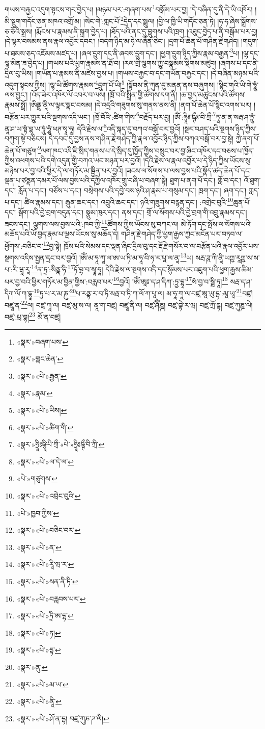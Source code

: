 གཡས་བརྐྱང་འདུག་སྟངས་གར་བྱེད་པ། །མཉམ་པར་:གཞག་པས་\footnote{«སྣར་»བཞག་པས་}བསྒོམ་པར་བྱ། །དེ་བཞིན་དུ་ནི་དེ་ཡི་འཁོར། །མི་སྡུག་གདོང་ཅན་མཁའ་འགྲོ་མ། །སེང་གེ་:གླང་པོ་\footnote{«སྣར་»གླང་ཆེན་}དྲེད་དང་སྦྲུལ། །བྱི་ལ་ཁྱི་ཡི་གདོང་ཅན་ཏེ། །ཧ་ཧ་ཞེས་སྒྲོགས་ཅ་ཅོའི་སྒྲས། །རྨོངས་པ་རྣམས་ནི་སྐྲག་བྱེད་པ། །ཐོད་པའི་ནང་དུ་བླུགས་པའི་ཁྲག །འཐུང་བྱེད་པ་ནི་བསྒོམ་པར་བྱ། །དེ་ལྟར་བསམས་ནས་རྣལ་འབྱོར་དབང་། །བདག་ཉིད་མ་ཧེ་ལ་ཞོན་ཅིང་། །དྲག་པོ་ཆེན་པོ་གཤིན་རྗེ་གཤེད། །གདུག་པ་ཐམས་ཅད་འཇོམས་མཛད་པ། །ཞལ་དྲུག་དང་ནི་ཞབས་དྲུག་དང་། །ཕྱག་དྲུག་ཉིད་ཀྱིས་རྣམ་བརྒྱན་\footnote{«སྣར་»«པེ་»རྒྱན་}པ། །ལྷ་དང་ལྷ་མིན་ཟ་བྱེད་པ། །གཡས་པའི་ཕྱག་རྣམས་ན་ཐོ་བ། །རལ་གྲི་ལྕགས་ཀྱུ་བསྣམས་སྡིགས་མཛུབ། །ཞགས་པ་དང་ནི་དྲིལ་བུ་ཡིས། །གཡོན་པ་རྣམས་ནི་མཛེས་བྱས་པ། །གཡས་བརྐྱང་བ་དང་གཡོན་བརྐྱང་དང་། །དེ་བཞིན་མཉམ་པའི་འདུག་སྟངས་ཀྱིས། །ལྷ་ཡི་ཚོགས་རྣམས་\footnote{«སྣར་»རྣམ་}དྲུག་པོ་ཡི།\footnote{«སྣར་»«པེ་»ཡིས།} །སྟོབས་ནི་ཀུན་དུ་མནན་ནས་བཞུགས། །སྙིང་གའི་ཡི་གེ་ཧཱུཾ་ལས་བྱུང་། །འོད་ཟེར་འཁོར་ལོ་འབར་བ་ལས། །ཁྲོ་བའི་སྤྲིན་གྱི་ཚོགས་དག་ནི། །ཆ་བྱད་མཚུངས་པའི་ཚོགས་རྣམས་སྤྲོ། །ཨིནྡྲ་ནཱི་ལ་ལྟར་སྣང་བསམ། །དེ་འདྲའི་གཟུགས་སུ་གནས་ནས་ནི། །ནག་པོ་ཆེན་པོ་སྙིང་འགས་པར། །བརྩོན་པར་གྱུར་པའི་སྔགས་འདི་ཡང་། །ཁྲོ་བོའི་:ཚིག་གིས་\footnote{«སྣར་»«པེ་»ཚིག་གི་}བརྗོད་པར་བྱ། །ཨོཾ་:ཧྲཱིཿ་ཥྚྀཿ་བི་ཀྲྀ་\footnote{«སྣར་»ཧྲཱིཿཥྚཱི་པི་ཀྲྀ་«པེ་»ཧྲཱིཿཥྚྀ་བི་ཀྲི་}ཏཱ་ན་ན་སརྦ་ཤ་ཏྲུཾ་ནཱ་ཤ་ཡ་སྟཾ་བྷ་ཡ་ཧཱུཾ་ཧཱུཾ་ཕཊ་སྭཱ་ཧཱ། དེའི་རྗེས་ལ་\footnote{«སྣར་»«པེ་»ལ་དེ་ལ་}འདི་སྐད་དུ་བཀའ་བསྒོ་བར་བྱའོ། །སྔར་བཤད་པའི་སྔགས་ཉིད་ཀྱིས་བཀུག་སྟེ་བཅིངས། དེ་དབང་དུ་བྱས་ནས་གཤིན་རྗེ་གཤེད་ཀྱི་རྣལ་འབྱོར་ཉིད་ཀྱིས་བཀའ་བསྒོ་བར་བྱ་སྟེ། ཀྱེ་ནག་པོ་ཆེན་པོ་གཙུག་\footnote{«པེ་»གཙུགས་}ལག་ཁང་འདི་ཇི་སྲིད་གནས་པ་དེ་སྲིད་དུ་ཁྱོད་ཀྱིས་བསྲུང་བར་བྱ་ཞིང་འཁོར་དང་བཅས་པ་ཁྱོད་ཀྱིས་འཕགས་པའི་དགེ་འདུན་གྱི་བཀའ་ཡང་མཉན་པར་བྱའོ། །དེའི་རྗེས་ལ་རྣལ་འབྱོར་པ་དེ་ཉིད་ཀྱིས་ཡོངས་སུ་མཉེས་པར་བྱ་བའི་ཕྱིར་དེ་ལ་གཏོར་མ་སྦྱིན་པར་བྱའོ། །ཟངས་ལ་སོགས་པ་ལས་བྱས་པའི་སྣོད་ཚད་ཆེན་པོ་དང་ལྡན་པ་ཙནྡན་དམར་པོ་ལས་བྱས་པའི་དཀྱིལ་འཁོར་གྲུ་བཞི་པ་བཞག་སྟེ། ཐུག་པ་ནག་པོ་དང་། གློ་བ་དང་། འོ་ཐུག་དང་། རློན་པ་དང་། བཙོས་པ་དང་། བསྲེགས་པའི་དབྱེ་བས་ཉའི་ཤ་རྣམ་པ་གསུམ་དང་། ཁྲག་དང་། ཞག་དང་། ཀླད་པ་དང་། ཚིལ་རྣམས་དང་། རྒུན་ཆང་དང་། འབྲུའི་ཆང་དང་། ཉའི་གཟུགས་བརྙན་དང་། :འགྲེང་བུའི་\footnote{«སྣར་»«པེ་»འབྲེང་བུའི་}ཆུན་པོ་དང་། སྒོག་པའི་བྱེ་བྲག་བདུན་དང་། སྣུམ་ཁུར་དང་། ནས་དང་། གྲོ་ལ་སོགས་པའི་བྱེ་བྲག་གི་འབྲུ་རྣམས་དང་། ཟངས་དང་། ལྕགས་ལས་བྱས་པའི་:ཁབ་ཀྱི་\footnote{«པེ་»ཁྱབ་ཀྱིས་}ཚོགས་ཀྱིས་ཡོངས་སུ་བཀང་ལ། མེ་ཏོག་དང་སྤོས་ལ་སོགས་པའི་མཆོད་པའི་ཡོ་བྱད་རྣམ་པ་ལྔས་ཡོངས་སུ་མཆོད་དེ། གཤིན་རྗེ་གཤེད་ཀྱི་ཕྱག་རྒྱས་ཀྱང་མངོན་པར་བཏབ་ལ་ཕྱོགས་:བཅིང་བ་\footnote{«སྣར་»«པེ་»བཅིང་བར་}བྱ་སྟེ། ཁྲོས་པའི་སེམས་དང་ལྡན་ཞིང་དྲིལ་བུ་དང་རྡོ་རྗེ་གསོར་བ་ལ་བརྩོན་པའི་རྣལ་འབྱོར་པས་སྔགས་འདིས་སྤྱན་དྲང་བར་བྱའོ། །ཨོཾ་མ་ཧཱ་ཀཱ་ལ་ཨ་ཡ་ཏི་མ་ཧཱ་བི་ཧ་ར་པཱ་ལ་ནཱ་\footnote{«སྣར་»«པེ་»ན་}ཡ། སརྦ་ཌཱ་ཀི་ནཱི་ཡཀྵ་རཱཀྵ་ས་ས་པ་:རི་ཝཱ་རཱ་\footnote{«སྣར་»«པེ་»རཱི་ཝ་ར་}ན་ཏྲ་:སིནྣ་ཧི་\footnote{«སྣར་»«པེ་»སན་ནི་ཏི་}ཏོ་བྷ་བ་སྭཱ་ཧཱ། དེའི་རྗེས་ལ་སྔགས་འདི་དང་སྙོམས་པར་འཇུག་པའི་ཕྱག་རྒྱས་ཚིམ་པར་བྱ་བའི་ཕྱིར་གཏོར་མ་བྱིན་གྱིས་:བརླབ་པར་\footnote{«སྣར་»«པེ་»བརླབས་པར་}བྱའོ། །ཨོཾ་ཨཱཿ་ད་ཤ་དིཀ་:ཏྲྱ་དྷྭ་\footnote{«སྣར་»«པེ་»ཏྲི་ཨ་དྷ་}སཾ་བྱ་བ་སྠི་ཏཱ།\footnote{«སྣར་»«པེ་»ཏ།} སརྦ་ད་ཤ་དིཀ་ལོ་ཀ་དྷཱ་\footnote{«སྣར་»«པེ་»དྷ་}ཏུ་པ་ར་མ་ཎུ་\footnote{«སྣར་»ནུ་}པ་རནྟ་ར་བ་ཏི་སརྦ་བ་ཏི་ཀ་ལོ་ཀ་པཱ་ལ། མ་ཧཱ་ཀཱ་ལ་བཛྲ་ཨཱ་ཡུ་དྷ་:མཱ་ཡཱ་\footnote{«སྣར་»«པེ་»མ་ཡ་}བཛྲ། བཛྲཱ་ན་\footnote{«སྣར་»«པེ་»ནཱི་}ལ། བཛྲ་ཀཱ་ལ། བཛྲ་མུ་ས་ལ། ནཱ་ག་བཛྲ། བཛྲཱ་ནི་ལ། བཛྲ་ཤཽཾཎྜ། བཛྲ་བྷེ་ར་ཝ། བཛྲ་ཀྲོ་དྷ། བཛྲ་ཀུཎྜ་ལེ། བཛྲ་:པྲ་བྷ།\footnote{«སྣར་»«པེ་»ཤོ་ན་དྷ། བཛྲ་ཀུཎ་ཌ་ལི།} མོ་ན་བཛྲ། 